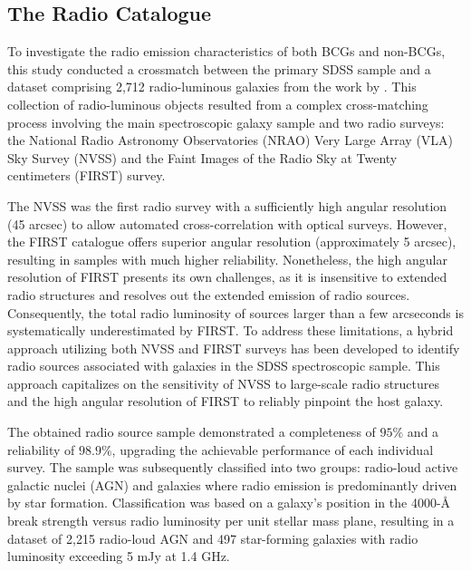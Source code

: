 \subsection{The Radio Catalogue}
To investigate the radio emission characteristics of both BCGs and non-BCGs, this study conducted a crossmatch between the primary SDSS sample and a dataset comprising 2,712 radio-luminous galaxies from the work by \cite{2005MNRAS.362....9B}. This collection of radio-luminous objects resulted from a complex cross-matching process involving the main spectroscopic galaxy sample and two radio surveys: the National Radio Astronomy Observatories (NRAO) Very Large Array (VLA) Sky Survey (NVSS) \cite{1998AJ....115.1693C} and the Faint Images of the Radio Sky at Twenty centimeters (FIRST) survey. \cite{1995ApJ...450..559B}

The NVSS was the first radio survey with a sufficiently high angular resolution (45 arcsec) to allow automated cross-correlation with optical surveys. However, the FIRST catalogue offers superior angular resolution (approximately 5 arcsec), resulting in samples with much higher reliability. Nonetheless, the high angular resolution of FIRST presents its own challenges, as it is insensitive to extended radio structures and resolves out the extended emission of radio sources. Consequently, the total radio luminosity of sources larger than a few arcseconds is systematically underestimated by FIRST. To address these limitations, a hybrid approach utilizing both NVSS and FIRST surveys has been developed to identify radio sources associated with galaxies in the SDSS spectroscopic sample. This approach capitalizes on the sensitivity of NVSS to large-scale radio structures and the high angular resolution of FIRST to reliably pinpoint the host galaxy.

The obtained radio source sample demonstrated a completeness of $95\%$ and a reliability of $98.9\%$, upgrading the achievable performance of each individual survey. The sample was subsequently classified into two groups: radio-loud active galactic nuclei (AGN) and galaxies where radio emission is predominantly driven by star formation. Classification was based on a galaxy's position in the 4000-Å break strength versus radio luminosity per unit stellar mass plane, resulting in a dataset of 2,215 radio-loud AGN and 497 star-forming galaxies with radio luminosity exceeding 5 mJy at 1.4 GHz.

